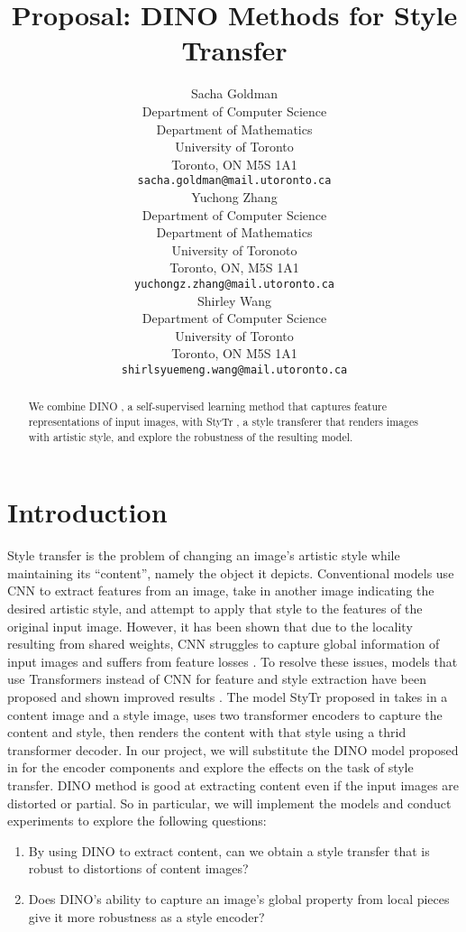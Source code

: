 \documentclass{article}
\title{Proposal: DINO Methods for Style Transfer}
\author{
  Sacha Goldman \\
  Department of Computer Science\\ 
  Department of Mathematics\\
  University of Toronto\\
  Toronto, ON M5S 1A1 \\
  \texttt{sacha.goldman@mail.utoronto.ca} \\
  \And
  Yuchong Zhang \\
  Department of Computer Science \\
  Department of Mathematics \\
  University of Toronoto \\
  Toronto, ON, M5S 1A1 \\
  \texttt{yuchongz.zhang@mail.utoronto.ca} \\
  \And
  Shirley Wang \\
  Department of Computer Science \\
  University of Toronto \\
  Toronto, ON M5S 1A1 \\
  \texttt{shirlsyuemeng.wang@mail.utoronto.ca} \\
}
\begin{document}
\maketitle

\begin{abstract}
We combine DINO \cite{DINO}, a self-supervised learning method that captures feature representations of input images, with StyTr \cite{ImageStyleTransformer}, a style transferer that renders images with artistic style, and explore the robustness of the resulting model.
\end{abstract}

\section{Introduction}
Style transfer is the problem of changing an image's artistic style while maintaining its ``content'', namely the object it depicts. Conventional models use CNN to extract features from an image, take in another image indicating the desired artistic style, and attempt to apply that style to the features of the original input image. However, it has been shown that due to the locality resulting from shared weights, CNN struggles to capture global information of input images and suffers from feature losses \cite{ImageStyleTransformer}. To resolve these issues, models that use Transformers instead of CNN for feature and style extraction have been proposed and shown improved results \cite{ImageStyleTransformer}. The model StyTr proposed in \cite{ImageStyleTransformer} takes in a content image and a style image, uses two transformer encoders to capture the content and style, then renders the content with that style using a thrid transformer decoder. In our project, we will substitute the DINO model proposed in \cite{DINO} for the encoder components and explore the effects on the task of style transfer. DINO method is good at extracting content even if the input images are distorted or partial. So in particular, we will implement the models and conduct experiments to explore the following questions:
\begin{enumerate}
  \item By using DINO to extract content, can we obtain a style transfer that is robust to distortions of content images?
  \item Does DINO's ability to capture an image's global property from local pieces give it more robustness as a style encoder?
\end{enumerate}
\end{document}
